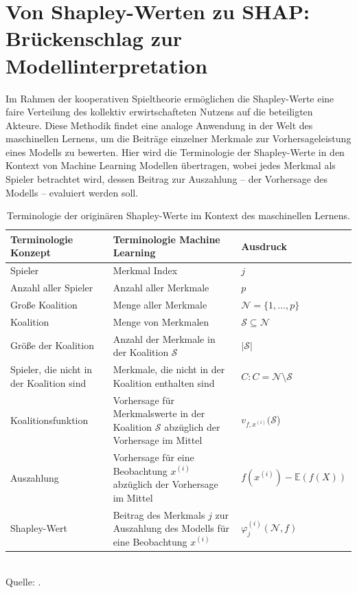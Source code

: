 \chapter{Von Shapley-Werten zu SHAP: Brückenschlag zur Modellinterpretation}

Im Rahmen der kooperativen Spieltheorie ermöglichen die Shapley-Werte eine faire Verteilung des kollektiv 
erwirtschafteten Nutzens auf die beteiligten Akteure. Diese Methodik findet eine analoge Anwendung 
in der Welt des maschinellen Lernens, um die Beiträge einzelner Merkmale zur Vorhersageleistung 
eines Modells zu bewerten. Hier wird die Terminologie der Shapley-Werte in den Kontext von Machine Learning 
Modellen übertragen, wobei jedes Merkmal als \glqq{}Spieler\grqq{} betrachtet wird, dessen Beitrag zur 
\glqq{}Auszahlung\grqq{} – der Vorhersage des Modells – evaluiert werden soll. 

\begin{table}[h]
    \caption{Terminologie der originären Shapley-Werte im Kontext des maschinellen Lernens.}
    \footnotesize
    \begin{tabularx}{\textwidth}{XXX}
    \toprule
    Terminologie Konzept & Terminologie Machine Learning & Ausdruck \\
    \midrule
    Spieler & Merkmal Index & $j$ \\
    Anzahl aller Spieler & Anzahl aller Merkmale & $p$ \\
    Große Koalition & Menge aller Merkmale & $\mathcal{N} = \{1, \ldots, p\}$\\
    Koalition & Menge von Merkmalen & $\mathcal{S} \subseteq \mathcal{N}$ \\
    Größe der Koalition & Anzahl der Merkmale in der Koalition $\mathcal{S}$ & $|\mathcal{S}|$\\
    Spieler, die nicht in der Koalition sind & Merkmale, die nicht in der Koalition enthalten sind & $C: C = \mathcal{N} \setminus \mathcal{S}$ \\
    Koalitionsfunktion & Vorhersage für Merkmalswerte in der Koalition $\mathcal{S}$ abzüglich der Vorhersage im Mittel & $v_{f, x^{(i)}}(\mathcal{S}$)\\
    Auszahlung & Vorhersage für eine Beobachtung $x^{(i)}$ abzüglich der Vorhersage im Mittel & $f(x^{(i)}) -  \mathbb{E}(f(X))$\\
    Shapley-Wert & Beitrag des Merkmals $j$ zur Auszahlung des Modells für eine Beobachtung $x^{(i)}$& $\varphi_j^{(i)}(\mathcal{N}, f)$\\
    \bottomrule
    \end{tabularx}
    \label{tab:shapley_terms}
    \normalsize\\
    Quelle: \cite[S. 26]{Molnar_2023}.
\end{table}

